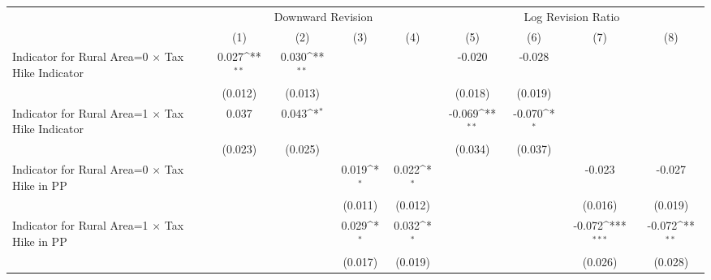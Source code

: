 {
\def\sym#1{\ifmmode^{#1}\else\(^{#1}\)\fi}
\begin{tabular}{l*{8}{c}}
\toprule
                    &\multicolumn{4}{c}{Downward Revision}                                                  &\multicolumn{4}{c}{Log Revision Ratio}                                                 \\\cmidrule(lr){2-5}\cmidrule(lr){6-9}
                    &\multicolumn{1}{c}{(1)}         &\multicolumn{1}{c}{(2)}         &\multicolumn{1}{c}{(3)}         &\multicolumn{1}{c}{(4)}         &\multicolumn{1}{c}{(5)}         &\multicolumn{1}{c}{(6)}         &\multicolumn{1}{c}{(7)}         &\multicolumn{1}{c}{(8)}         \\
\midrule
Indicator for Rural Area=0 $\times$ Tax Hike Indicator&       0.027\sym{**} &       0.030\sym{**} &                     &                     &      -0.020         &      -0.028         &                     &                     \\
                    &     (0.012)         &     (0.013)         &                     &                     &     (0.018)         &     (0.019)         &                     &                     \\
Indicator for Rural Area=1 $\times$ Tax Hike Indicator&       0.037         &       0.043\sym{*}  &                     &                     &      -0.069\sym{**} &      -0.070\sym{*}  &                     &                     \\
                    &     (0.023)         &     (0.025)         &                     &                     &     (0.034)         &     (0.037)         &                     &                     \\
Indicator for Rural Area=0 $\times$ Tax Hike in PP&                     &                     &       0.019\sym{*}  &       0.022\sym{*}  &                     &                     &      -0.023         &      -0.027         \\
                    &                     &                     &     (0.011)         &     (0.012)         &                     &                     &     (0.016)         &     (0.019)         \\
Indicator for Rural Area=1 $\times$ Tax Hike in PP&                     &                     &       0.029\sym{*}  &       0.032\sym{*}  &                     &                     &      -0.072\sym{***}&      -0.072\sym{**} \\
                    &                     &                     &     (0.017)         &     (0.019)         &                     &                     &     (0.026)         &     (0.028)         \\

\end{tabular}}
